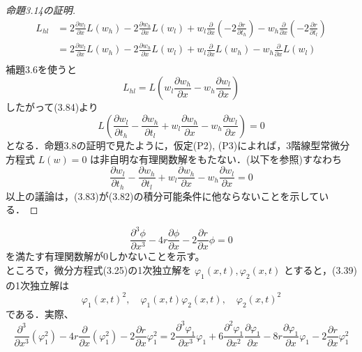 \documentclass[paper=a4, fontsize=11pt]{jlreq} %
\newenvironment{story}{%
  \begin{mdframed}[
    backgroundcolor=red!5, %
    linewidth=0pt,         %
    innertopmargin=10pt,   %
    innerbottommargin=10pt,
    innerrightmargin=10pt, %
    innerleftmargin=10pt
  ]%
}{%
  \end{mdframed}%
}
\theoremstyle{break}
\theoremstyle{qa}
\begin{document}
\begin{story}
\begin{proof}[命題3.14の証明]
\begin{align*}
    L_{hl} &=2\frac{\partial w_l}{\partial x}L(w_h) - 2\frac{\partial w_h}{\partial x}L(w_l)+w_{l}\frac{\partial}{\partial x}\left(-2\frac{\partial r}{\partial t_{h}}\right)-w_{h}\frac{\partial}{\partial x}\left(-2\frac{\partial r}{\partial t_{l}}\right)\\
    &= 2\frac{\partial w_l}{\partial x}L(w_h) - 2\frac{\partial w_h}{\partial x}L(w_l) + w_l\frac{\partial}{\partial x}L(w_h) - w_h\frac{\partial}{\partial x}L(w_l) \\
\end{align*}
補題3.6を使うと
\begin{equation*}
    L_{hl} = L\left( w_l\frac{\partial w_h}{\partial x} - w_h\frac{\partial w_l}{\partial x} \right)
\end{equation*}
したがって(3.84)より
\begin{equation*}
    L\left( \frac{\partial w_l}{\partial t_h} - \frac{\partial w_h}{\partial t_l} + w_l\frac{\partial w_h}{\partial x} - w_h\frac{\partial w_l}{\partial x} \right) = 0
\end{equation*}
となる．命題3.8の証明で見たように，仮定(P2), (P3)によれば，3階線型常微分方程式 $L(w)=0$ は非自明な有理関数解をもたない．(以下を参照)すなわち
\begin{equation*}
    \frac{\partial w_l}{\partial t_h} - \frac{\partial w_h}{\partial t_l} + w_l\frac{\partial w_h}{\partial x} - w_h\frac{\partial w_l}{\partial x} = 0
\end{equation*}
以上の議論は，(3.83)が(3.82)の積分可能条件に他ならないことを示している．
\end{proof}
\end{story}
\begin{equation}
    \frac{\partial^3 \phi}{\partial x^3} - 4r\frac{\partial \phi}{\partial x} - 2\frac{\partial r}{\partial x}\phi = 0 \label{eq:3.39}
\end{equation}
を満たす有理関数解が0しかないことを示す。\\
ところで，微分方程式(3.25)の1次独立解を $\varphi_1(x,t), \varphi_2(x,t)$ とすると，(3.39)の1次独立解は
\begin{equation*}
    \varphi_1(x,t)^2, \quad \varphi_1(x,t)\varphi_2(x,t), \quad \varphi_2(x,t)^2
\end{equation*}
である．実際、
\begin{equation*}
    \frac{\partial^3}{\partial x^3}(\varphi_1^2) - 4r\frac{\partial}{\partial x}(\varphi_1^2) - 2\frac{\partial r}{\partial x}\varphi_1^2 = 2\frac{\partial^3 \varphi_1}{\partial x^3}\varphi_1 + 6\frac{\partial^2 \varphi_1}{\partial x^2}\frac{\partial \varphi_1}{\partial x} - 8r\frac{\partial \varphi_1}{\partial x}\varphi_1 - 2\frac{\partial r}{\partial x}\varphi_1^2
\end{equation*}
\end{document}
